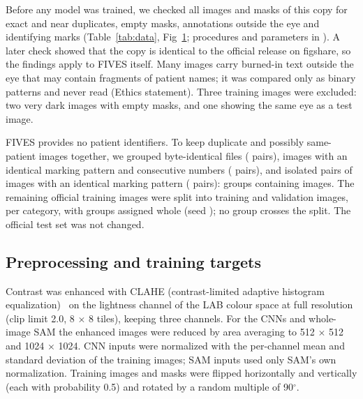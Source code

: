 Before any model was trained, we checked all images and masks of this copy for exact and near duplicates, empty masks,
annotations outside the eye and identifying marks (Table~\ref{tab:data}, Fig~\ref{fig:audit}; procedures and parameters in
). A later check showed that the copy is identical to the official release on figshare, so the
findings apply to FIVES itself. Many images carry burned-in text outside the eye that may contain fragments of patient
names; it was compared only as binary patterns and never read (Ethics statement). Three training images were excluded: two very dark images with empty masks, and one
showing the same eye as a test image.

FIVES provides no patient identifiers. To keep duplicate and possibly same-patient images together, we grouped
byte-identical files (\NGroupPairsIdentical{} pairs), images with an identical marking pattern and consecutive numbers
(\NGroupPairsAdjacent{} pairs), and isolated pairs of images with an identical marking pattern (\NGroupPairsIsolated{}
pairs): \NGroups{} groups containing \NGroupedImages{} images. The remaining \NTrainVal{} official training images were
split into \NTrain{} training and \NVal{} validation images, \NValPerCategory{} per category, with groups assigned whole
(seed \SplitSeed{}); no group crosses the split. The official test set was not changed.



\begin{figure}[!h]
\caption{\CapAudit}
\label{fig:audit}
\end{figure}

\subsection*{Preprocessing and training targets}
Contrast was enhanced with CLAHE (contrast-limited adaptive histogram equalization)~\cite{zuiderveld1994clahe} on the
lightness channel of the LAB colour space at full resolution (clip limit 2.0, 8 $\times$ 8 tiles), keeping three channels.
For the CNNs and whole-image SAM the enhanced images were reduced by area averaging to 512 $\times$ 512 and
1024 $\times$ 1024. CNN inputs were normalized with the per-channel mean and standard deviation of the training images;
SAM inputs used only SAM's own normalization. Training images and masks were flipped horizontally and vertically (each with
probability 0.5) and rotated by a random multiple of 90$^\circ$.

